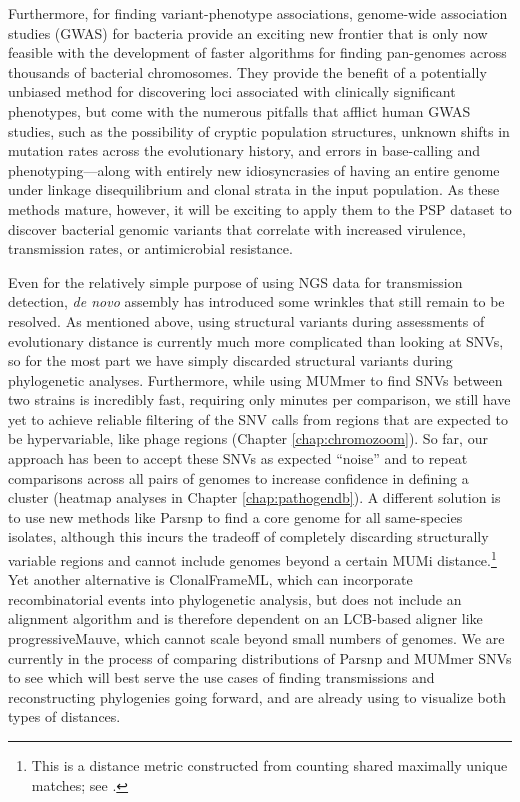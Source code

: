 Furthermore, for finding variant-phenotype associations, genome-wide association studies (GWAS) for bacteria provide an exciting new frontier that is only now feasible with the development of faster algorithms for finding pan-genomes across thousands of bacterial chromosomes.\autocite{Brynildsrud2016} They provide the benefit of a potentially unbiased method for discovering loci associated with clinically significant phenotypes, but come with the numerous pitfalls that afflict human GWAS studies, such as the possibility of cryptic population structures, unknown shifts in mutation rates across the evolutionary history, and errors in base-calling and phenotyping—along with entirely new idiosyncrasies of having an entire genome under linkage disequilibrium and clonal strata in the input population.\autocite{Read2014,Brynildsrud2016} As these methods mature, however, it will be exciting to apply them to the PSP dataset to discover bacterial genomic variants that correlate with increased virulence, transmission rates, or antimicrobial resistance.

Even for the relatively simple purpose of using NGS data for transmission detection, \emph{de novo} assembly has introduced some wrinkles that still remain to be resolved. As mentioned above, using structural variants during assessments of evolutionary distance is currently much more complicated than looking at SNVs, so for the most part we have simply discarded structural variants during phylogenetic analyses. Furthermore, while using MUMmer\autocite{Delcher2003} to find SNVs between two strains is incredibly fast, requiring only minutes per comparison, we still have yet to achieve reliable filtering of the SNV calls from regions that are expected to be hypervariable, like phage regions (Chapter \ref{chap:chromozoom}). So far, our approach has been to accept these SNVs as expected ``noise'' and to repeat comparisons across all pairs of genomes to increase confidence in defining a cluster (heatmap analyses in Chapter \ref{chap:pathogendb}). A different solution is to use new methods like Parsnp\autocite{Treangen2014} to find a core genome for all same-species isolates, although this incurs the tradeoff of completely discarding structurally variable regions and cannot include genomes beyond a certain MUMi distance.\footnote{This is a distance metric constructed from counting shared maximally unique matches; see \textcite{Deloger2009}.} Yet another alternative is ClonalFrameML,\autocite{Didelot2015} which can incorporate recombinatorial events into phylogenetic analysis, but does not include an alignment algorithm and is therefore dependent on an LCB-based aligner like progressiveMauve,\autocite{Darling2010} which cannot scale beyond small numbers of genomes. We are currently in the process of comparing distributions of Parsnp and MUMmer SNVs to see which will best serve the use cases of finding transmissions and reconstructing phylogenies going forward, and are already using \pathogendbviz{} to visualize both types of distances.

